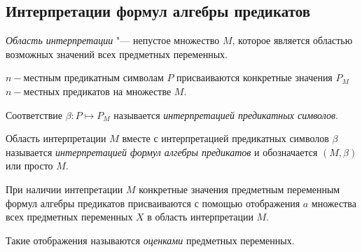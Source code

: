 \subsection*{Интерпретации формул алгебры предикатов}
\begin{definition}
    \textit{Область интерпретации} "--- непустое множество $M$, которое является областью возможных значений всех предметных переменных.
    
    $n-$местным предикатным символам $P$ присваиваются конкретные значения $P_M$ $n-$местных предикатов на множестве $M$.

    Соответствие $\beta : P \mapsto P_M$ называется \textit{интерпретацией предикатных символов}.

    Область интерпретации $M$ вместе с интерпретацией предикатных символов $\beta$ называется \textit{интерпретацией формул алгебры предикатов} и обозначается $(M,\beta)$ или просто $M$.
\end{definition}

\begin{definition}
    При наличии интепретации $M$ конкретные значения предметным переменным формул алгебры предикатов присваиваются с помощью отображения $a$ множества всех предметных переменных $X$ в область интерпретации $M$.

    Такие отображения называются \textit{оценками} предметных переменных.
\end{definition}

